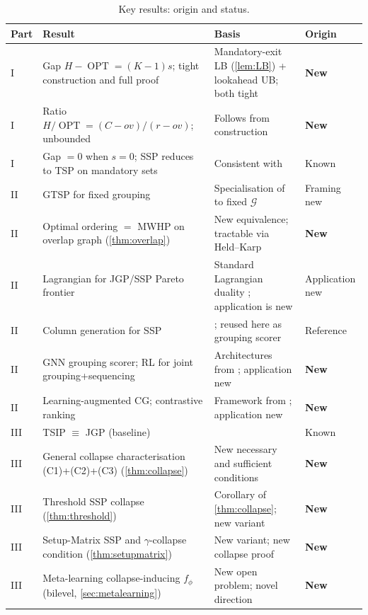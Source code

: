 \documentclass[11pt,a4paper]{article}
\theoremstyle{plain}
\theoremstyle{definition}
\DeclareMathOperator{\OPT}{OPT}
\newcommand{\calG}{\mathcal{G}}
\begin{document}
\begin{table}[h!]
\centering
\caption{Key results: origin and status.}
\label{tab:summary}
\renewcommand{\arraystretch}{1.3}
\small
\begin{tabularx}{\textwidth}{@{}lXXl@{}}
\toprule
\textbf{Part} & \textbf{Result} & \textbf{Basis} & \textbf{Origin}\\
\midrule
I & Gap $H-\OPT=(K-1)s$; tight construction and full proof
  & Mandatory-exit LB (\cref{lem:LB}) + lookahead UB; both tight
  & \textbf{New}\\
I & Ratio $H/\OPT=(C-ov)/(r-ov)$; unbounded
  & Follows from construction
  & \textbf{New}\\
I & Gap $=0$ when $s=0$; SSP reduces to TSP on mandatory sets
  & Consistent with \cite{Ghiani2007}
  & Known\\
II & GTSP for fixed grouping
  & Specialisation of \cite{Ghiani2007} to fixed $\calG$
  & Framing new\\
II & Optimal ordering $=$ MWHP on overlap graph (\cref{thm:overlap})
  & New equivalence; tractable via Held--Karp
  & \textbf{New}\\
II & Lagrangian for JGP/SSP Pareto frontier
  & Standard Lagrangian duality \cite{Wolsey1998}; application is new
  & Application new\\
II & Column generation for SSP
  & \cite{daSilva2021}; reused here as grouping scorer
  & Reference\\
II & GNN grouping scorer; RL for joint grouping+sequencing
  & Architectures from \cite{Xu2019,Kool2019}; application new
  & \textbf{New}\\
II & Learning-augmented CG; contrastive ranking
  & Framework from \cite{Gasse2019}; application new
  & \textbf{New}\\
III & TSIP $\equiv$ JGP (baseline)
  & \cite{TangDenardo1988}
  & Known\\
III & General collapse characterisation (C1)+(C2)+(C3) (\cref{thm:collapse})
  & New necessary and sufficient conditions
  & \textbf{New}\\
III & Threshold SSP collapse (\cref{thm:threshold})
  & Corollary of \cref{thm:collapse}; new variant
  & \textbf{New}\\
III & Setup-Matrix SSP and $\gamma$-collapse condition (\cref{thm:setupmatrix})
  & New variant; new collapse proof
  & \textbf{New}\\
III & Meta-learning collapse-inducing $f_\phi$ (bilevel, \cref{sec:metalearning})
  & New open problem; novel direction
  & \textbf{New}\\
\bottomrule
\end{tabularx}
\end{table}
\end{document}
